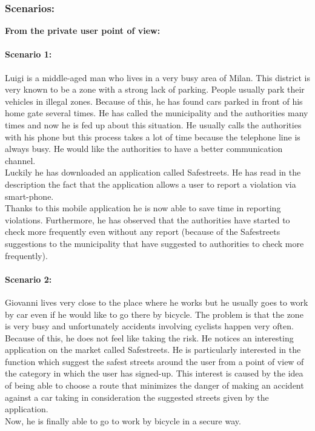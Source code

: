 \documentclass[titlepage]{article}
\begin{document}
\subsubsection{Scenarios:}
\begin{center}
\textbf{From the private user point of view:}
\end{center}

\paragraph{Scenario 1:}Luigi is a middle-aged man who lives in a very busy area of Milan. This district is very known to be a zone with a strong lack of parking. People usually park their vehicles in illegal zones.
Because of this, he has found  cars parked in front of his home gate several times. He has called the municipality and the authorities many times and now he is fed up about this situation. He usually calls the authorities with his phone but this process takes a lot of time because the telephone line is always busy. He would like the authorities to have a better communication channel.\\Luckily he has downloaded an application called Safestreets. He has read in the description the fact that the application allows a user to report a violation via smart-phone.\\
Thanks to this mobile application he is now able to save time in reporting violations. Furthermore, he has observed that  the authorities have started to check more frequently even without any report (because of the Safestreets suggestions to the municipality that have suggested to authorities to check more frequently).
\paragraph{Scenario 2:}Giovanni lives very close to the place where he works but he usually goes to work by car even if he would like to go there by bicycle. The problem is that the zone is very busy and unfortunately accidents involving cyclists happen very often. Because of this, he does not feel like taking the risk.
He notices an interesting application on the market called Safestreets. He is particularly interested in the function which suggest the safest streets around the user from a point of view of the category in which the user has signed-up. This interest is caused by the idea of ​​being able to choose a route that minimizes the danger of making an accident against a car taking in consideration the suggested streets given by the application.\\
Now, he is finally able to go to work by bicycle in a secure way.
\end{document}
